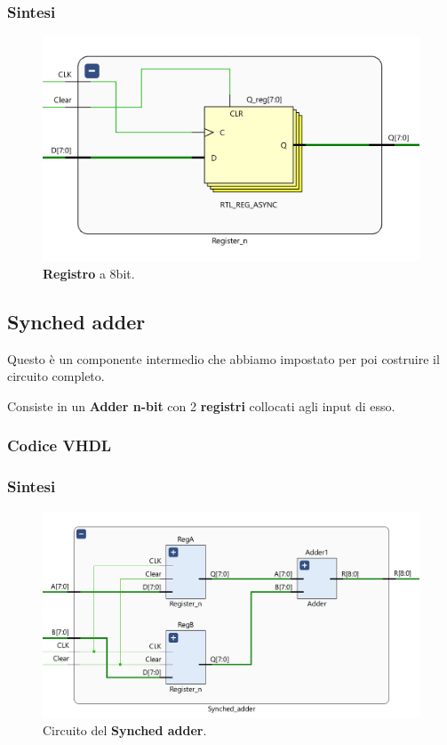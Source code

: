 \documentclass[12pt]{article}
\begin{document}
        \subsubsection{Sintesi}
            \begin{figure}[ht]
                \centering
                \includegraphics[scale=0.45]{Register.png}
                \caption{\textbf{Registro} a 8bit.}
            \end{figure}

    \subsection{Synched adder}
        Questo è un componente intermedio che abbiamo impostato per poi costruire il circuito completo.

        Consiste in un \textbf{Adder n-bit} con 2 \textbf{registri} collocati agli input di esso.

        \subsubsection{Codice VHDL}
            
        
        \subsubsection{Sintesi}
            \begin{figure}[ht]
                \centering
                \includegraphics[scale=0.75]{Synched_adder.png}
                \caption{Circuito del \textbf{Synched adder}.}
            \end{figure}
\end{document}
